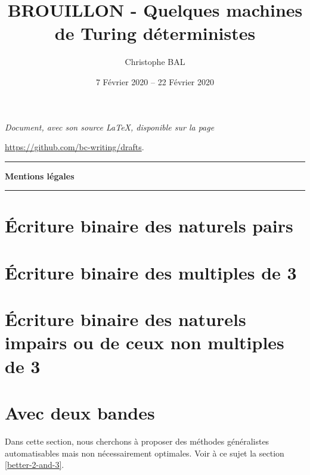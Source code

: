 \documentclass[a4paper, 12pt]{scrartcl}
\begin{document}
\title{BROUILLON - Quelques machines de Turing déterministes}
\author{Christophe BAL}
\date{7 Février 2020 -- 22 Février 2020}

\maketitle

\begin{center}
	\itshape
	Document, avec son source \LaTeX, disponible sur la page
	
	\url{https://github.com/bc-writing/drafts}.
\end{center}


\bigskip


\begin{center}
	\hrule\vspace{.3em}
	{
		\fontsize{1.35em}{1em}\selectfont
		\textbf{Mentions \og légales \fg}
	}
			
	\vspace{0.45em}
	\doclicenseThis
	\hrule
\end{center}


\bigskip
\setcounter{tocdepth}{2}
\tableofcontents



\newpage
\section{Écriture binaire des naturels pairs}

	


\newpage
\section{Écriture binaire des multiples de 3} \label{divisibility-by-3}

	


\newpage
\section{Écriture binaire des naturels impairs ou de ceux non multiples de 3}

	


\newpage
\section{Avec deux bandes}

	Dans cette section, nous cherchons à proposer des méthodes généralistes automatisables mais non nécessairement optimales.
	Voir à ce sujet la section \ref{better-2-and-3}.
\end{document}
